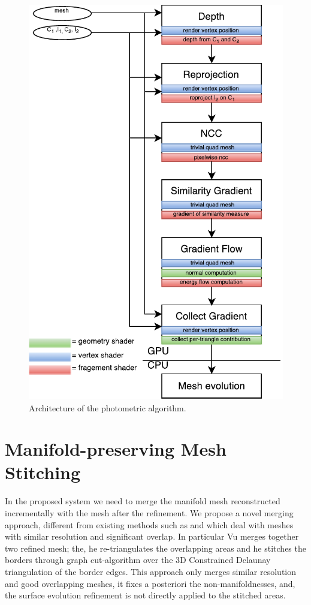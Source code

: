 \begin{figure}[tp]
\centering
\includegraphics[height=0.92\textheight]{./img/ch-incr-dens/incr-shaders-architecture}
\caption{Architecture of the photometric algorithm.}
\label{fig:openglIncrRef}
\end{figure}


\section{Manifold-preserving Mesh Stitching}
\label{sec:Mesh_merging}
In the proposed system we need to merge the manifold mesh reconstructed incrementally with the mesh after the refinement.
We propose a novel merging approach, different from existing methods such as \cite{turk1994zippered} and \cite{VuPhD011} which deal with meshes with similar resolution and significant overlap. 
In particular  Vu  \cite{VuPhD011} merges together two  refined mesh; the,  he re-triangulates the overlapping areas and he stitches the borders through graph cut-algorithm over the 3D Constrained Delaunay triangulation of the border edges.
This approach only merges similar resolution and good overlapping meshes, it fixes a posteriori the non-manifoldnesses, and, the surface evolution refinement is not directly applied to the stitched areas.


